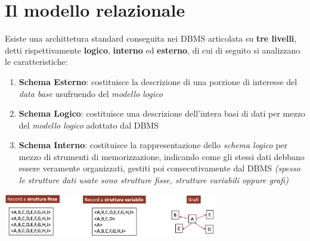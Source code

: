 \documentclass{article}
\begin{document}
\pagestyle{empty}

\section*{Il modello relazionale}
\large
Esiste una archittetura standard conseguita nei DBMS articolata su \textbf{tre livelli}, detti rispettivamente \textbf{logico}, \textbf{interno} ed \textbf{esterno}, di cui di seguito si analizzano le caratteristiche:
\begin{enumerate}
    \renewcommand{\labelenumi}{-}
    \itemsep0em
    \item \textbf{Schema Esterno}: costituisce la descrizione di una porzione di interesse del \textit{data base} usufruendo del \textit{modello logico}
    \item \textbf{Schema Logico}: costituisce una descrizione dell'intera basi di dati per mezzo del \textit{modello logico} adottato dal DBMS
    \item \textbf{Schema Interno}: costituisce la rappresentazione dello \textit{schema logico} per mezzo di strumenti di memorizzazione, indicando come gli stessi dati debbano essere veramente organizzati, gestiti poi consecutivamente dal DBMS \textit{(spesso le strutture dati usate sono strutture fisse, strutture variabili oppure grafi)}
\end{enumerate}
\begin{center} 
    \includegraphics[width=0.7\textwidth]{foto 1.png}
\end{center}
\end{document}
